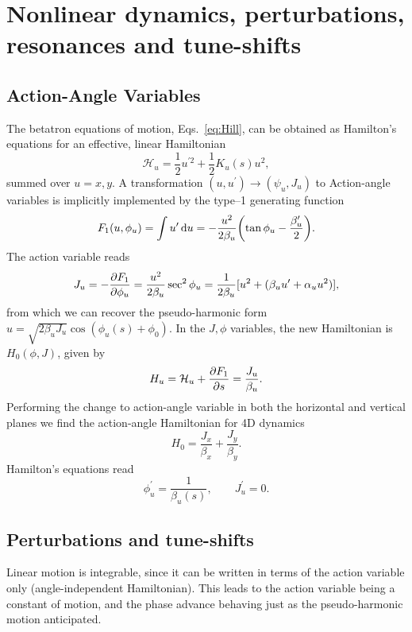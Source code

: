 \section{Nonlinear dynamics, perturbations, resonances and tune-shifts}

\subsection{Action-Angle Variables}
The betatron equations of motion, Eqs.~\eqref{eq:Hill}, can be obtained as Hamilton's equations for an effective, linear Hamiltonian
\begin{equation}
    \mathcal{H}_u=\frac{1}{2}u^{\prime2}+\frac{1}{2}K_u(s)u^2,
\end{equation}
summed over $u=x,y$.
A transformation $(u,u^\prime)\to(\psi_u, J_u)$ to Action-angle variables is implicitly implemented by the type--1 generating function \cite{lee_accelerator_2004}
\begin{equation}
    F_1(u,\phi_u)=\int{u}^\prime\dd{{u}}=-\frac{u^2}{2\beta_u}\qty(\tan \phi_u-\frac{\beta_u^\prime}{2}).
\end{equation}
The action variable reads
\begin{equation}
    J_u=-\pdv{F_1}{\phi_u} = \frac{u^2}{2\beta_u}\sec^2\phi_u = \frac{1}{2\beta_u}[u^2 + (\beta_u u^\prime + \alpha_u u^2)],
    \label{eq:action}
\end{equation}
from which we can recover the pseudo-harmonic form $u=\sqrt{2\beta_u J_u}\cos(\phi_u(s)+\phi_0)$. In the $J,\phi$ variables, the new Hamiltonian is $H_0(\phi, J)$,  given by
\begin{equation}
    H_u=\mathcal{H}_u+\pdv{F_1}{s} = \frac{J_u}{\beta_u}.
\end{equation}
Performing the change to action-angle variable in both the horizontal and vertical planes we find the action-angle Hamiltonian for 4D dynamics
\begin{equation}
    H_0= \frac{J_x}{\beta_x} +  \frac{J_y}{\beta_y}.
\end{equation}
Hamilton's equations read
\begin{equation}
    \phi_u^\prime = \frac{1}{\beta_u(s)},\qquad J_u^\prime=0.
\end{equation}
\subsection{Perturbations and tune-shifts}
Linear motion is integrable, since it can be written in terms of the action variable only (angle-independent Hamiltonian). This leads to the action variable being a constant of motion, and the phase advance behaving just as the pseudo-harmonic motion anticipated.

